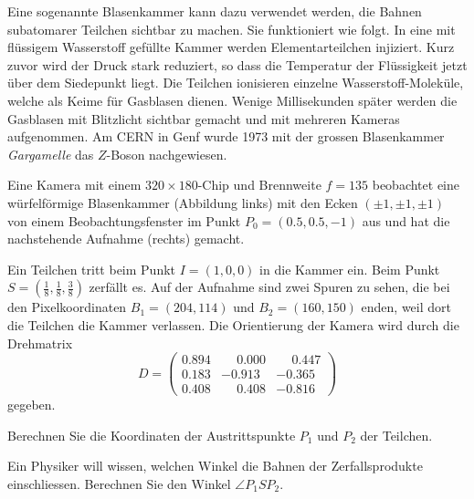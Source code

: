 Eine sogenannte Blasenkammer kann dazu verwendet werden, 
die Bahnen subatomarer Teilchen sichtbar zu machen.
Sie funktioniert wie folgt.
In eine mit flüssigem Wasserstoff gefüllte Kammer werden Elementarteilchen
injiziert.
Kurz zuvor wird der Druck stark reduziert, so dass die Temperatur
der Flüssigkeit jetzt über dem Siedepunkt liegt.
Die Teilchen ionisieren einzelne Wasserstoff-Moleküle, welche als
Keime für Gasblasen dienen.
Wenige Millisekunden später werden die Gasblasen mit Blitzlicht
sichtbar gemacht und mit mehreren Kameras aufgenommen.
Am CERN in Genf wurde 1973 mit der grossen Blasenkammer {\em Gargamelle} das
$Z$-Boson nachgewiesen.

Eine Kamera mit einem $320\times 180$-Chip und Brennweite $f=135$ 
beobachtet eine würfelförmige Blasenkammer (Abbildung links) mit den Ecken
$(\pm1,\pm1,\pm1)$ von einem Beobachtungsfenster im Punkt
$P_0=(0.5,0.5,-1)$ aus und hat die nachstehende Aufnahme (rechts) gemacht.
\begin{center}
\end{center}
Ein Teilchen tritt beim Punkt $I=(1,0,0)$ in die Kammer ein.
Beim Punkt $S=(\frac18,\frac18,\frac38)$ zerfällt es.
Auf der Aufnahme sind zwei Spuren zu sehen, die bei den Pixelkoordinaten
$B_1=(204,114)$ und $B_2=(160,150)$ enden, weil dort die Teilchen die Kammer
verlassen.
Die Orientierung der Kamera wird durch die Drehmatrix
\[
D=\begin{pmatrix}
0.894&\phantom{-}0.000&\phantom{-}0.447\\
0.183&          -0.913&          -0.365\\
0.408&\phantom{-}0.408&          -0.816
\end{pmatrix}
\]
gegeben.
\begin{teilaufgaben}
\item
Berechnen Sie die Koordinaten der Austrittspunkte $P_1$ und $P_2$ der Teilchen.
\item
Ein Physiker will wissen, welchen Winkel die Bahnen der Zerfallsprodukte
einschliessen.
Berechnen Sie den Winkel $\angle P_1SP_2$.
\end{teilaufgaben}


